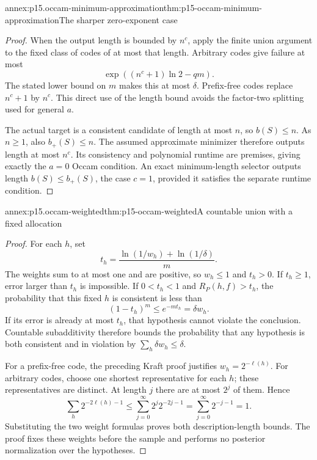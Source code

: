 \begin{annexitem}{annex:p15.occam-minimum-approximation}{thm:p15-occam-minimum-approximation}{The sharper zero-exponent case}
\begin{proof}
When the output length is bounded by \(n^c\), apply the
finite union argument to the fixed class of codes of at
most that length. Arbitrary codes give failure at most
\[
              \exp((n^c+1)\ln2-qm).
\]
The stated lower bound on \(m\) makes this at most
\(\delta\). Prefix-free codes replace \(n^c+1\) by \(n^c\).
This direct use of the length bound avoids the factor-two
splitting used for general \(a\).

The actual target is a consistent candidate of length
at most \(n\), so \(b(S)\leq n\).
As \(n\geq1\), also \(b_+(S)\leq n\).
The assumed approximate minimizer therefore outputs
length at most \(n^c\). Its consistency and polynomial
runtime are premises, giving exactly the \(a=0\)
Occam condition. An exact minimum-length selector
outputs length \(b(S)\leq b_+(S)\), the case \(c=1\),
provided it satisfies the separate runtime condition.
\end{proof}
\end{annexitem}

\begin{annexitem}{annex:p15.occam-weighted}{thm:p15-occam-weighted}{A countable union with a fixed allocation}
\begin{proof}
For each \(h\), set
\[
                   t_h=\frac{\ln(1/w_h)+\ln(1/\delta)}m.
\]
The weights sum to at most one and are positive, so
\(w_h\leq1\) and \(t_h>0\).
If \(t_h\geq1\), error larger than \(t_h\) is impossible.
If \(0<t_h<1\) and \(R_P(h,f)>t_h\), the probability
that this fixed \(h\) is consistent is less than
\[
             (1-t_h)^m\leq e^{-mt_h}=\delta w_h.
\]
If its error is already at most \(t_h\), that hypothesis
cannot violate the conclusion. Countable subadditivity
therefore bounds the probability that any hypothesis
is both consistent and in violation by
\(\sum_h\delta w_h\leq\delta\).

For a prefix-free code, the preceding Kraft proof
justifies \(w_h=2^{-\ell(h)}\).
For arbitrary codes, choose one shortest representative
for each \(h\); these representatives are distinct.
At length \(j\) there are at most \(2^j\) of them. Hence
\[
       \sum_h2^{-2\ell(h)-1}
           \leq\sum_{j=0}^\infty2^j2^{-2j-1}
           =\sum_{j=0}^\infty2^{-j-1}=1.
\]
Substituting the two weight formulas proves both
description-length bounds. The proof fixes these
weights before the sample and performs no posterior
normalization over the hypotheses.
\end{proof}
\end{annexitem}

